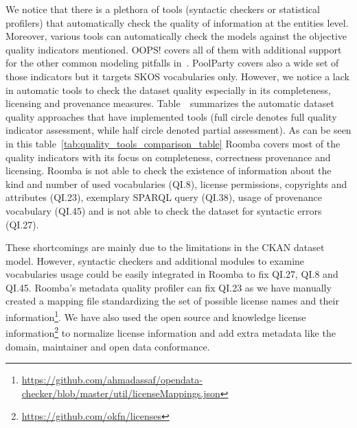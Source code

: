 \documentclass[onecolumn, crcready]{../../Util/LaTEX/iosart2c}
\begin{document}
\indent We notice that there is a plethora of tools (syntactic checkers or statistical profilers) that automatically check the quality of information at the entities level. Moreover, various tools can automatically check the models against the objective quality indicators mentioned. OOPS! covers all of them with additional support for the other common modeling pitfalls in~\cite{Maria:KEOD:13}. PoolParty covers also a wide set of those indicators but it targets SKOS vocabularies only. However, we notice a lack in automatic tools to check the dataset quality especially in its completeness, licensing and provenance measures. Table~\ summarizes the automatic dataset quality approaches that have implemented tools (full circle denotes full quality indicator assessment, while half circle denoted partial assessment). As can be seen in this table~\ref{tab:quality_tools_comparison_table} Roomba covers most of the quality indicators with its focus on completeness, correctness provenance and licensing. Roomba is not able to check the existence of information about the kind and number of used vocabularies (QI.8), license permissions, copyrights and attributes (QI.23), exemplary SPARQL query (QI.38), usage of provenance vocabulary (QI.45) and is not able to check the dataset for syntactic errors (QI.27).

These shortcomings are mainly due to the limitations in the CKAN dataset model. However, syntactic checkers and additional modules to examine vocabularies usage could be easily integrated in Roomba to fix QI.27, QI.8 and QI.45. Roomba's metadata quality profiler can fix QI.23 as we have manually created a mapping file standardizing the set of possible license names and their information\footnote{\url{https://github.com/ahmadassaf/opendata-checker/blob/master/util/licenseMappings.json}}. We have also used the open source and knowledge license information\footnote{\url{https://github.com/okfn/licenses}} to normalize license information and add extra metadata like the domain, maintainer and open data conformance.
\end{document}
